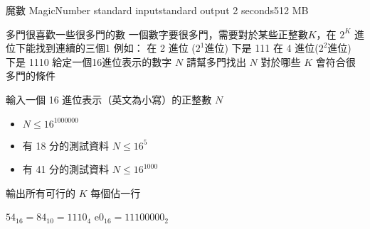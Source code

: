 \gdef\thisproblemauthor{}
\gdef\thisproblemdeveloper{}
\gdef\thisproblemorigin{}
\begin{problem}{魔數 MagicNumber}
{standard input}{standard output}
{2 seconds}{512 MB}{}

多門很喜歡一些很多門的數\newline
一個數字要很多門，需要對於某些正整數$K$，在 $2^K$ 進位下能找到連續的三個1\newline
\newline
例如： 在 2 進位 ($2^1$進位) 下是 111 在 4 進位($2^2$進位) 下是 1110\newline
\newline
給定一個16進位表示的數字 $N$\newline
請幫多門找出 $N$ 對於哪些 $K$ 會符合很多門的條件\newline

\InputFile

輸入一個 16 進位表示（英文為小寫）的正整數 $N$
\begin{iofmt}
\begin{itemize}
	\item $N \leq 16^{1000000}$
	\item 有 18 分的測試資料 $N \leq 16^5$
	\item 有 41 分的測試資料 $N \leq 16^{1000}$
\end{itemize}
\end{iofmt}

\OutputFile

輸出所有可行的 $K$ \newline
每個佔一行

\Examples

\begin{example}
%
%
%
\end{example}
$54_{16} = 84_{10} = 1110_4$ \newline
$\textrm{e}0_{16} = 1110 0000_2$ \newline

\end{problem}
